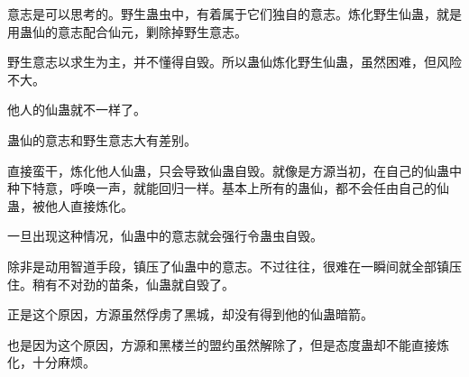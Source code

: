 \begin{this_body}
意志是可以思考的。野生蛊虫中，有着属于它们独自的意志。炼化野生仙蛊，就是用蛊仙的意志配合仙元，剿除掉野生意志。

野生意志以求生为主，并不懂得自毁。所以蛊仙炼化野生仙蛊，虽然困难，但风险不大。

他人的仙蛊就不一样了。

蛊仙的意志和野生意志大有差别。

直接蛮干，炼化他人仙蛊，只会导致仙蛊自毁。就像是方源当初，在自己的仙蛊中种下特意，呼唤一声，就能回归一样。基本上所有的蛊仙，都不会任由自己的仙蛊，被他人直接炼化。

一旦出现这种情况，仙蛊中的意志就会强行令蛊虫自毁。

除非是动用智道手段，镇压了仙蛊中的意志。不过往往，很难在一瞬间就全部镇压住。稍有不对劲的苗条，仙蛊就自毁了。

正是这个原因，方源虽然俘虏了黑城，却没有得到他的仙蛊暗箭。

也是因为这个原因，方源和黑楼兰的盟约虽然解除了，但是态度蛊却不能直接炼化，十分麻烦。

\end{this_body}

